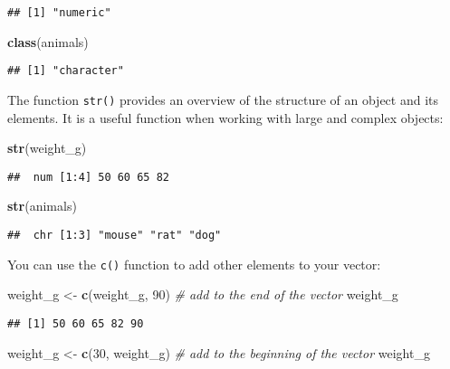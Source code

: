 \documentclass[]{book}
\newenvironment{Shaded}{\begin{snugshade}}{\end{snugshade}}
\newcommand{\KeywordTok}[1]{\textcolor[rgb]{0.13,0.29,0.53}{\textbf{#1}}}
\newcommand{\DecValTok}[1]{\textcolor[rgb]{0.00,0.00,0.81}{#1}}
\newcommand{\StringTok}[1]{\textcolor[rgb]{0.31,0.60,0.02}{#1}}
\newcommand{\CommentTok}[1]{\textcolor[rgb]{0.56,0.35,0.01}{\textit{#1}}}
\newcommand{\NormalTok}[1]{#1}
\begin{document}
\begin{verbatim}
## [1] "numeric"
\end{verbatim}

\begin{Shaded}
\begin{Highlighting}[]
\KeywordTok{class}\NormalTok{(animals)}
\end{Highlighting}
\end{Shaded}

\begin{verbatim}
## [1] "character"
\end{verbatim}

The function \texttt{str()} provides an overview of the structure of an
object and its elements. It is a useful function when working with large
and complex objects:

\begin{Shaded}
\begin{Highlighting}[]
\KeywordTok{str}\NormalTok{(weight_g)}
\end{Highlighting}
\end{Shaded}

\begin{verbatim}
##  num [1:4] 50 60 65 82
\end{verbatim}

\begin{Shaded}
\begin{Highlighting}[]
\KeywordTok{str}\NormalTok{(animals)}
\end{Highlighting}
\end{Shaded}

\begin{verbatim}
##  chr [1:3] "mouse" "rat" "dog"
\end{verbatim}

You can use the \texttt{c()} function to add other elements to your
vector:

\begin{Shaded}
\begin{Highlighting}[]
\NormalTok{weight_g <-}\StringTok{ }\KeywordTok{c}\NormalTok{(weight_g, }\DecValTok{90}\NormalTok{) }\CommentTok{# add to the end of the vector}
\NormalTok{weight_g}
\end{Highlighting}
\end{Shaded}

\begin{verbatim}
## [1] 50 60 65 82 90
\end{verbatim}

\begin{Shaded}
\begin{Highlighting}[]
\NormalTok{weight_g <-}\StringTok{ }\KeywordTok{c}\NormalTok{(}\DecValTok{30}\NormalTok{, weight_g) }\CommentTok{# add to the beginning of the vector}
\NormalTok{weight_g}
\end{Highlighting}
\end{Shaded}
\end{document}
